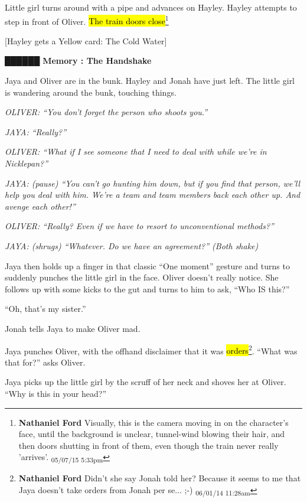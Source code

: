Little girl turns around with a pipe and advances on Hayley.  Hayley attempts to step in front of Oliver.  \hl{The train doors close}\footnote{\textbf{Nathaniel Ford }Visually, this is the camera moving in on the character's face, until the background is unclear, tunnel-wind blowing their hair, and then doors shutting in front of them, even though the train never really 'arrives'. \textsubscript{05/07/15 5:33pm}}



{[}Hayley gets a Yellow card: The Cold Water{]}



 {\LARGE \textbf{ {\color[RGB]{51,51,51}██████} } }  {\LARGE \textbf{ Memory : The Handshake} } 



Jaya and Oliver are in the bunk.  Hayley and Jonah have just left.  The little girl is wandering around the bunk, touching things.

\textit{OLIVER: ``You don't forget the person who shoots you.''}

\textit{JAYA: ``Really?''}

\textit{OLIVER: ``What if I see someone that I need to deal with while we're in Nicklepan?''}

\textit{JAYA: (pause) ``You can't go hunting him down, but if you find that person, we'll help you deal with him.  We're a team and team members back each other up. And avenge each other!''}

\textit{OLIVER: ``Really?  Even if we have to resort to unconventional methods?''}

\textit{JAYA: (shrugs)  ``Whatever.  Do we have an agreement?''  (Both shake)}

Jaya then holds up a  finger in that classic ``One moment'' gesture and turns to suddenly punches the little girl in the face.  Oliver doesn't really notice.  She follows up with some kicks to the gut and turns to him to ask,  ``Who IS this?''

``Oh, that's my sister.''

Jonah tells Jaya to make Oliver mad.

Jaya punches Oliver, with the offhand disclaimer that it was \hl{orders}\footnote{\textbf{Nathaniel Ford }Didn't she say Jonah told her? Because it seems to me that Jaya doesn't take orders from Jonah per se... ;-) \textsubscript{06/01/14 11:28am}}.  ``What was that for?'' asks Oliver.

Jaya picks up the little girl by the scruff of her neck and shoves her at Oliver.  ``Why is this in your head?''

